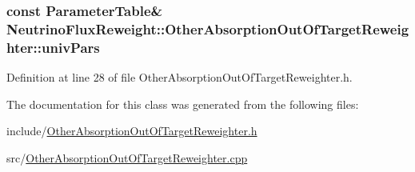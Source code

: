 \hypertarget{class_neutrino_flux_reweight_1_1_other_absorption_out_of_target_reweighter_a02fc32769d87191294df9aaca580f529}{
\subsubsection[{univ\-Pars}]{\setlength{\rightskip}{0pt plus 5cm}const {\bf Parameter\-Table}\& Neutrino\-Flux\-Reweight\-::\-Other\-Absorption\-Out\-Of\-Target\-Reweighter\-::univ\-Pars}}\label{class_neutrino_flux_reweight_1_1_other_absorption_out_of_target_reweighter_a02fc32769d87191294df9aaca580f529}


Definition at line 28 of file Other\-Absorption\-Out\-Of\-Target\-Reweighter.\-h.



The documentation for this class was generated from the following files\-:\begin{DoxyCompactItemize}
\item 
include/\hyperlink{_other_absorption_out_of_target_reweighter_8h}{Other\-Absorption\-Out\-Of\-Target\-Reweighter.\-h}\item 
src/\hyperlink{_other_absorption_out_of_target_reweighter_8cpp}{Other\-Absorption\-Out\-Of\-Target\-Reweighter.\-cpp}\end{DoxyCompactItemize}
